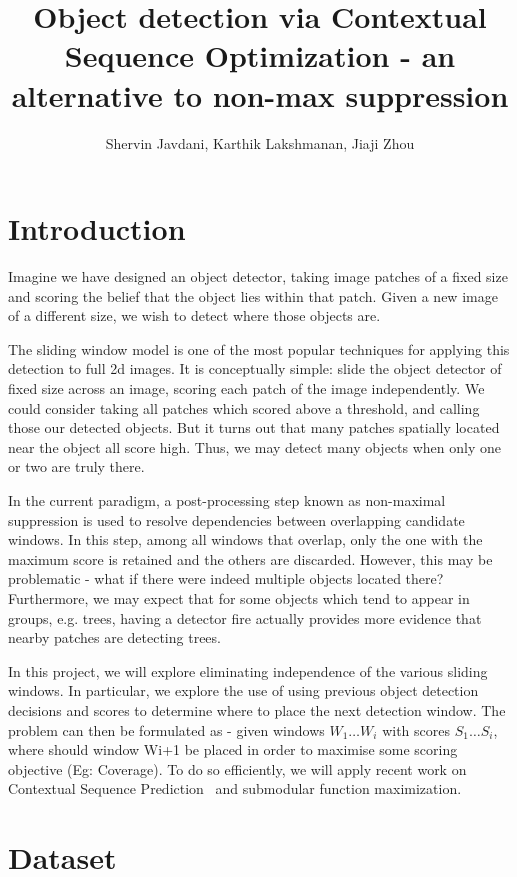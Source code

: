 \documentclass[11pt]{article}
\title{ \bf
Object detection via Contextual Sequence Optimization - an alternative to non-max suppression
}
\date{}
\author{Shervin Javdani, Karthik Lakshmanan, Jiaji Zhou}
\begin{document}
\maketitle

\vspace{-15mm}

\section{Introduction}
Imagine we have designed an object detector, taking image patches of a fixed size and scoring the belief that the object lies within that patch. Given a new image of a different size, we wish to detect where those objects are.

The sliding window model is one of the most popular techniques for applying this detection to full 2d images. It is conceptually simple: slide the object detector of fixed size across an image, scoring each patch of the image independently. We could consider taking all patches which scored above a threshold, and calling those our detected objects. But it turns out that many patches spatially located near the object all score high. Thus, we may detect many objects when only one or two are truly there.

In the current paradigm, a post-processing step known as non-maximal suppression is used to resolve dependencies between overlapping candidate windows. In this step, among all windows that overlap, only the one with the maximum score is retained and the others are discarded. However, this may be problematic - what if there were indeed multiple objects located there? Furthermore, we may expect that for some objects which tend to appear in groups, e.g. trees, having a detector fire actually provides more evidence that nearby patches are detecting trees.

In this project, we will explore eliminating independence of the various sliding windows. In particular, we explore the use of using previous object detection decisions and scores to determine where to place the next detection window. The problem can then be formulated as - given windows $W_1 \ldots W_i$ with scores $S_1 \ldots S_i$, where should window Wi+1 be placed in order to maximise some scoring objective (Eg: Coverage). To do so efficiently, we will apply recent work on Contextual Sequence Prediction~\cite{dey_2012_conseqopt} and submodular function maximization.

\section{Dataset}




\end{document}
